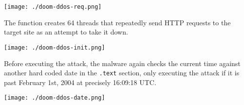 \documentclass[11pt]{article}
\begin{document}
\begin{center}
\texttt{[image: ./doom-ddos-req.png]}
\end{center}

The function creates 64 threads that repeatedly send HTTP requests to
the target site as an attempt to take it down.

\begin{center}
\texttt{[image: ./doom-ddos-init.png]}
\end{center}

Before executing the attack, the malware again checks the current time
against another hard coded date in the \texttt{.text} section, only executing
the attack if it is past February 1st, 2004 at precisely 16:09:18 UTC.

\begin{center}
\texttt{[image: ./doom-ddos-date.png]}
\end{center}
\end{document}
